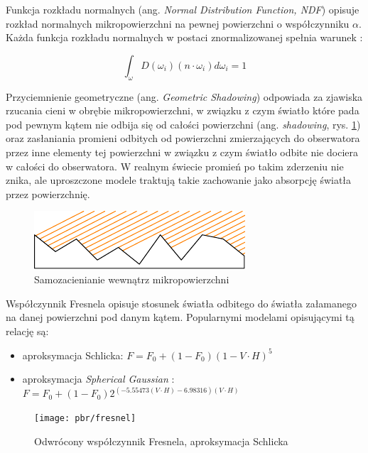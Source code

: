 \documentclass[../main.tex]{subfiles}
\begin{document}
Funkcja rozkładu normalnych (ang. \textit{Normal Distribution Function, NDF})
opisuje rozkład normalnych mikropowierzchni na pewnej powierzchni o
współczynniku $\alpha$. Każda funkcja rozkładu normalnych w postaci
znormalizowanej spełnia warunek \cite{NDFReed}:

\[
  \int_{\omega} {
    D(\omega_i)
    (n \cdot \omega_i)
    d \omega_i
  } = 1
\]

Przyciemnienie geometryczne (ang. \textit{Geometric Shadowing}) odpowiada za
zjawiska rzucania cieni w obrębie mikropowierzchni, w związku z czym światło
które pada pod pewnym kątem nie odbija się od całości powierzchni (ang.
\textit{shadowing}, rys. \ref{fig:GeometricShadowing}) oraz zasłaniania
promieni odbitych od powierzchni zmierzających do obserwatora przez inne
elementy tej powierzchni w związku z czym światło odbite nie dociera w całości
do obserwatora. W realnym świecie promień po takim zderzeniu nie znika, ale
uproszczone modele traktują takie zachowanie jako absorpcję światła przez
powierzchnię.

\begin{figure}[h]
  \centering
  \includegraphics{illustrations/pbr/geometry_shadowing.pdf}
  \vspace{0.25cm}
  \caption{Samozacienianie wewnątrz mikropowierzchni}
	\label{fig:GeometricShadowing}
\end{figure}

Współczynnik Fresnela opisuje stosunek światła odbitego do światła załamanego
na danej powierzchni pod danym kątem. Popularnymi modelami opisującymi tą
relację są:

\begin{itemize}
\item aproksymacja Schlicka: $F = F_0 + (1 - F_0)(1-V \cdot H)^5$
\item aproksymacja \textit{Spherical Gaussian} \cite{SphericalGaussianLegarde}:
	$ F = F_0 +(1−F_0) 2^{
		\left(−5.55473\left(V \cdot H\right)−6.98316\right) (V \cdot H)
	} $
\end{itemize}

\begin{figure}[ht]
	\centering
  \texttt{[image: pbr/fresnel]}
	\caption{Odwrócony współczynnik Fresnela, aproksymacja Schlicka}
\end{figure}
\end{document}
